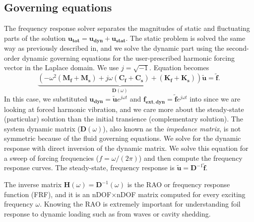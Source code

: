 \documentclass[10pt]{article}
\newcommand{\mbf}[1]{\mathbf{#1}}
\newcommand{\be}{\begin{eqnarray}}
\newcommand{\ee}{\end{eqnarray}}
\begin{document}
\subsection{Governing equations}
The {frequency response solver} separates the magnitudes of static and fluctuating parts of the solution
%
$\mbf{u_{tot}}= \mbf{{u}_{dyn}} + \mbf{u_{stat}}$.
%
The static problem is solved the same way as previously described in, and we solve the dynamic part using the second-order dynamic governing equations for the user-prescribed harmonic forcing vector in the Laplace domain.
We use $j = \sqrt{-1}$.
Equation becomes
\begin{equation}
    \label{eqn:dyn}
    \underbrace{
        \left(-\omega^2  \left(\mbf{M_f + M_s}  \right) +
        j\omega    \left(\mbf{C_f +C_s}\right) + \left(\mbf{K_f + K_s}\right) \right)
    }_{\mbf{D}(\omega)}
    \mbf{\tilde{u}}
    = \mbf{\tilde{f}}.
\end{equation}
%
In this case, we substituted $\mbf{u_{dyn}} =\mbf{\tilde{u}}e^{j \omega  t}$ and $\mbf{f_{ext,dyn}} = \mbf{\tilde{f}}e^{j \omega t}$ into  since we are looking at forced harmonic vibration, and we care more about the steady-state (particular) solution than the initial transience (complementary solution).
The system dynamic matrix ($\mbf{D}(\omega)$), also known as the \emph{impedance matrix}, is not symmetric because of the fluid governing equations.
We solve for the dynamic response with direct inversion of the dynamic matrix.
We solve this equation for a sweep of forcing frequencies ($f = \omega/(2 \pi)$) and then compute the frequency response curves.
The steady-state, frequency response is $\mbf{\tilde{u}} = \mbf{D}^{-1}\mbf{\tilde{f}}$.

The inverse matrix $\mbf{H}(\omega) = \mbf{D}^{-1}(\omega)$ is the RAO or frequency response function (FRF), and it is an nDOF$\times$nDOF matrix computed for every exciting frequency $\omega$.
Knowing the RAO is extremely important for understanding foil response to dynamic loading such as from waves or cavity shedding.

\clearpage
\end{document}

